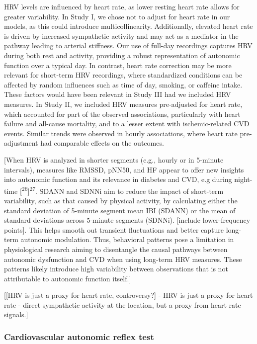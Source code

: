 \documentclass[
  a4paper,
  headsepline=true,
  open=any]{scrbook}
\begin{document}
HRV levels are influenced by heart rate, as lower resting heart rate
allows for greater variability. In Study I, we chose not to adjust for
heart rate in our models, as this could introduce multicollinearity.
Additionally, elevated heart rate is driven by increased sympathetic
activity and may act as a mediator in the pathway leading to arterial
stiffness. Our use of full-day recordings captures HRV during both rest
and activity, providing a robust representation of autonomic function
over a typical day. In contrast, heart rate correction may be more
relevant for short-term HRV recordings, where standardized conditions
can be affected by random influences such as time of day, smoking, or
caffeine intake. These factors would have been relevant in Study III had
we included HRV measures. In Study II, we included HRV measures
pre-adjusted for heart rate, which accounted for part of the observed
associations, particularly with heart failure and all-cause mortality,
and to a lesser extent with ischemic-related CVD events. Similar trends
were observed in hourly associations, where heart rate pre-adjustment
had comparable effects on the outcomes.

{[}When HRV is analyzed in shorter segments (e.g., hourly or in 5-minute
intervals), measures like RMSSD, pNN50, and HF appear to offer new
insights into autonomic function and its relevance in diabetes and CVD,
e.g during night-time {[}\textsuperscript{26}{]}\textsuperscript{27}.
SDANN and SDNNi aim to reduce the impact of short-term variability, such
as that caused by physical activity, by calculating either the standard
deviation of 5-minute segment mean IBI (SDANN) or the mean of standard
deviations across 5-minute segments (SDNNi). {[}include lower-frequency
points{]}. This helps smooth out transient fluctuations and better
capture long-term autonomic modulation. Thus, behavioral patterns pose a
limitation in physiological research aiming to disentangle the causal
pathways between autonomic dysfunction and CVD when using long-term HRV
measures. These patterns likely introduce high variability between
observations that is not attributable to autonomic function itself.{]}

{[}{[}HRV is just a proxy for heart rate, controversy?{]} - HRV is just
a proxy for heart rate - direct sympathetic activity at the location,
but a proxy from heart rate signals.{]}

\hypertarget{cardiovascular-autonomic-reflex-test}{%
\subsubsection{Cardiovascular autonomic reflex
test}\label{cardiovascular-autonomic-reflex-test}}
\end{document}
